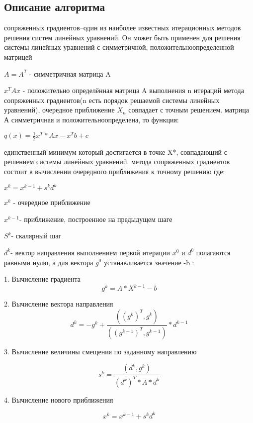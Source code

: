 \documentclass{report}
\begin{document}
\begin{center}
\section*{Описание алгоритма}
\end{center}
 сопряженных градиентов–один из наиболее известных итерационных методов решения систем линейных уравнений. Он может быть применен для решения системы линейных уравнений с симметричной, положительноопределенной матрицей
\par$A = A^T $ - симметричная матрица A 
\par$x^T A x$ - положительно определённая матрица A 
 выполнения n итераций метода сопряженных градиентов(n есть порядок решаемой системы линейных уравнений), очередное приближение $X_n$ совпадает с точным решением.
 матрица А симметричная и положительноопределена, то функция:
\begin {center}
$q(x) =  \frac{1}{2} x^T * Ax - x^Tb + c$
\end {center}
 единственный минимум который достигается в точке X*, совпадающий с решением системы линейных уравнений.
 метода сопряженных градиентов состоит в вычислении очередного приближения к точному решению
где:
\begin {center}
$x^k = x^{k-1} + s^k d^k$
\end {center}

\par $x^k$ - очередное приближение
\par $x^{k-1}$- приближение, построенное на предыдущем шаге
\par $S^k$- скалярный шаг
\par $d^k$- вектор направления
 выполнением первой итерации $x^0$ и $d^0$ полагаются равными нулю, а для вектора $g^0$ устанавливается значение -b
:

1. Вычисление градиента
$$g^k=A*X^{k-1}-b$$

2.   Вычисление вектора направления
$$d^k= -g^k + \frac{((g^k)^T, g^k)}{((g^{k-1})^T, g^{k-1})} * d^{k-1}$$


3.   Вычисление величины смещения по заданному направлению

$$s^k = \frac{(d^k, g^k)}{(d^k)^T * A * d^k}$$

4.   Вычисление нового приближения

$$x^k = x^{k-1} + s^k d^k$$
\newpage
\end{document}
